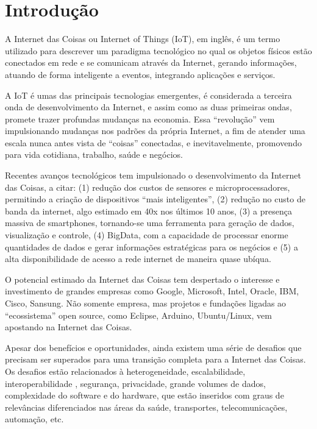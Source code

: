
\chapter{Introdução}

A Internet das Coisas ou Internet of Things (IoT)\cite{Ashton2009},
em inglês, é um termo utilizado para descrever um paradigma tecnológico
no qual os objetos físicos estão conectados em rede e se comunicam
através da Internet, gerando informações, atuando de forma inteligente
a eventos, integrando aplicações e serviços.

A IoT é umas das principais tecnologias emergentes, é considerada
a terceira onda de desenvolvimento da Internet\cite{GoldmanSachs2014},
e assim como as duas primeiras ondas, promete trazer profundas mudanças
na economia. Essa ``revolução'' vem impulsionando mudanças nos padrões
da própria Internet, a fim de atender uma escala nunca antes vista
de ``coisas'' conectadas, e inevitavelmente, promovendo para vida
cotidiana, trabalho, saúde e negócios.

Recentes avanços tecnológicos tem impulsionado o desenvolvimento da
Internet das Coisas, a citar: (1) redução dos custos de sensores e
microprocessadores, permitindo a criação de dispositivos ``mais inteligentes'',
(2) redução no custo de banda da internet, algo estimado em 40x nos
últimos 10 anos, (3) a presença massiva de smartphones, tornando-se
uma ferramenta para geração de dados, visualização e controle, (4)
BigData, com a capacidade de processar enorme quantidades de dados
e gerar informações estratégicas para os negócios e (5) a alta disponibilidade
de acesso a rede internet de maneira quase ubíqua\cite{GoldmanSachs2014}.

O potencial estimado da Internet das Coisas tem despertado o interesse
e investimento de grandes empresas como Google, Microsoft, Intel,
Oracle, IBM, Cisco, Sansung. Não somente empresa, mas projetos e
fundações ligadas ao ``ecossistema'' open source, como Eclipse,
Arduino, Ubuntu/Linux, vem apostando na Internet das Coisas. 

Apesar dos benefícios e oportunidades, ainda existem uma série de
desafios que precisam ser superados para uma transição completa para
a Internet das Coisas\cite{mattern2010,teixeira2011}. Os desafios
estão relacionados à heterogeneidade, escalabilidade, interoperabilidade
, segurança, privacidade, grande volumes de dados, complexidade do
software e do hardware, que estão inseridos com graus de relevâncias
diferenciados nas áreas da saúde, transportes, telecomunicações, automação,
etc.


